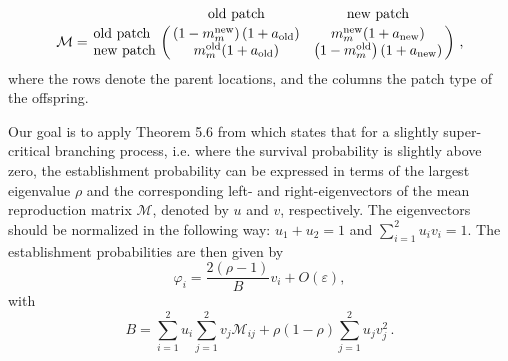\documentclass[11pt]{article}
\newcommand{\chg}[1]{\textcolor{change}{#1}}
\begin{document}
\begin{equation}\label{Seq:mean_repro}
\mathcal{M} = \bordermatrix{ ~ & \text{old patch} & \text{new patch} \cr
	\text{old patch} & \left(1-m_m^{\text{new}}\right) (1+a_{\text{old}}) & m_m^{\text{new}} (1+a_{\text{new}}) \cr
	\text{new patch} & m_m^{\text{old}} (1+a_{\text{old}}) & \left(1-m_m^{\text{old}}\right) (1+a_{\text{new}})
}\ ,
\end{equation}
where the rows denote the parent locations, and the columns the patch type of the offspring.

Our goal is to apply Theorem 5.6 from \citet{haccou_book} which states that for a slightly super-critical branching process, \chg{i.e. where the survival probability is slightly above zero}, the establishment probability can be expressed in terms of the largest eigenvalue $\rho$ and the corresponding left- and right-eigenvectors of the mean reproduction matrix \chg{$\mathcal{M}$}, denoted by $u$ and $v$, respectively. The eigenvectors should be normalized in the following way: $u_1+u_2 = 1$ and $\sum_{i=1}^2 u_i v_i = 1$. The establishment probabilities are then given by 
\begin{equation}\label{Seq:theory}
\varphi_i = \frac{2(\rho-1)}{B} v_i + O(\varepsilon), 
\end{equation}
with
\begin{equation} 
B = \sum_{i=1}^2 u_i \sum_{j=1}^2 v_j \mathcal{M}_{ij} + \rho(1-\rho) \sum_{j=1}^2 u_j v_j^2\, . 
\end{equation} 
\end{document}
